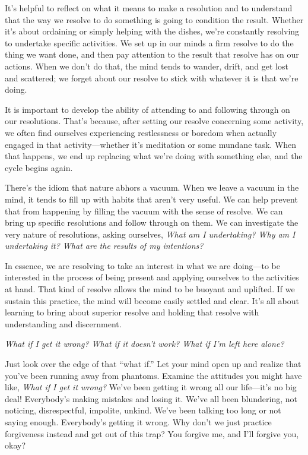 It's helpful to reflect on what it means to make a resolution and to 
understand that the way we resolve to do something is going to 
condition the result. Whether it's about ordaining or simply helping 
with the dishes, we're constantly resolving to undertake specific 
activities. We set up in our minds a firm resolve to do the thing we 
want done, and then pay attention to the result that resolve has on our 
actions. When we don't do that, the mind tends to wander, drift, and 
get lost and scattered; we forget about our resolve to stick with 
whatever it is that we're doing.

It is important to develop the ability of attending to and following 
through on our resolutions. That's because, after setting our resolve 
concerning some activity, we often find ourselves experiencing 
restlessness or boredom when actually engaged in that 
activity---whether it's meditation or some mundane task. When that 
happens, we end up replacing what we're doing with something else, and 
the cycle begins again.

There's the idiom that nature abhors a vacuum. When we leave a vacuum 
in the mind, it tends to fill up with habits that aren't very useful. 
We can help prevent that from happening by filling the vacuum with the 
sense of resolve. We can bring up specific resolutions and follow 
through on them. We can investigate the very nature of resolutions, 
asking ourselves, \emph{What am I undertaking? Why am I undertaking it? 
What are the results of my intentions?}

In essence, we are resolving to take an interest in what we are 
doing---to be interested in the process of being present and applying 
ourselves to the activities at hand. That kind of resolve allows the 
mind to be buoyant and uplifted. If we sustain this practice, the mind 
will become easily settled and clear. It's all about learning to bring 
about superior resolve and holding that resolve with understanding and 
discernment.


\emph{What if I get it wrong? What if it doesn't work? What if I'm left 
here alone?}

Just look over the edge of that ``what if.'' Let your mind open up and 
realize that you've been running away from phantoms. Examine the 
attitudes you might have like, \emph{What if I get it wrong?} We've 
been getting it wrong all our life---it's no big deal! Everybody's 
making mistakes and losing it. We've all been blundering, not noticing, 
disrespectful, impolite, unkind. We've been talking too long or not 
saying enough. Everybody's getting it wrong. Why don't we just practice 
forgiveness instead and get out of this trap? You forgive me, and I'll 
forgive you, okay?

